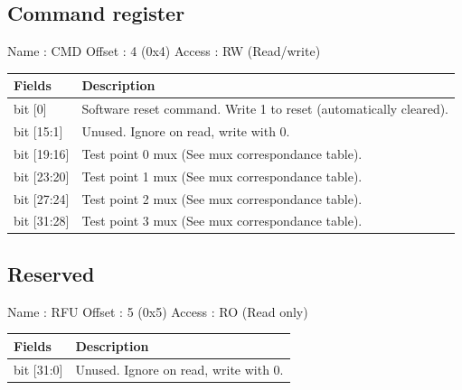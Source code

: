 \documentclass[11pt,a4paper]{article}
\begin{document}
\subsection{Command register}

Name   : CMD \newline
Offset : 4 (0x4) \newline
Access : RW (Read/write) \newline

\begin{table}[h!]
  \begin{tabularx}{\textwidth}{ l X }
    \hline
    \textbf{Fields} & \textbf{Description}\\
    \hline
    bit [0]     & Software reset command. Write 1 to reset (automatically cleared). \\
    bit [15:1]  & Unused. Ignore on read, write with 0. \\
    bit [19:16] & Test point 0 mux (See mux correspondance table). \\
    bit [23:20] & Test point 1 mux (See mux correspondance table). \\
    bit [27:24] & Test point 2 mux (See mux correspondance table). \\
    bit [31:28] & Test point 3 mux (See mux correspondance table). \\
    \hline
  \end{tabularx}
\end{table}

\subsection{Reserved}

Name   : RFU \newline
Offset : 5 (0x5) \newline
Access : RO (Read only) \newline

\begin{table}[h!]
  \begin{tabularx}{\textwidth}{ l X }
    \hline
    \textbf{Fields} & \textbf{Description}\\
    \hline
    bit [31:0] & Unused. Ignore on read, write with 0. \\
    \hline
  \end{tabularx}
\end{table}
\end{document}
